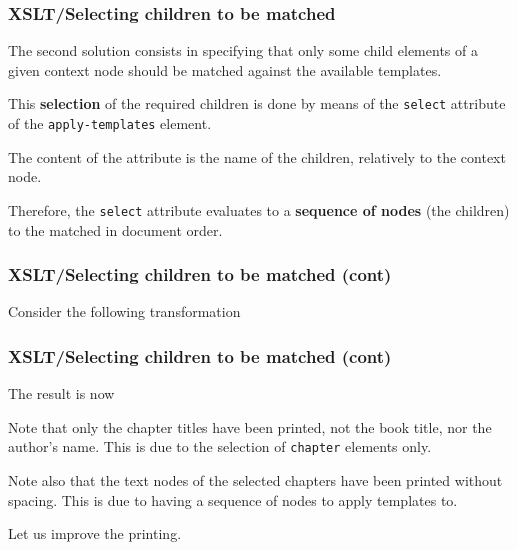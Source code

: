 %
\begin{frame}
\frametitle{XSLT/Selecting children to be matched}

The second solution consists in specifying that only some child
elements of a given context node should be matched against the
available templates.

\bigskip

This \textbf{selection} of the required children is done by means of
the \texttt{select} attribute of the \texttt{apply-templates}
element. 

\bigskip

The content of the attribute is the name of the children,
relatively to the context node.

\bigskip

Therefore, the \texttt{select} attribute evaluates to a
\textbf{sequence of nodes} (the children) to the matched in document
order.

\end{frame}

%
\begin{frame}
\frametitle{XSLT/Selecting children to be matched (cont)}

Consider the following \XSLT transformation

\end{frame}

%
\begin{frame}
\frametitle{XSLT/Selecting children to be matched (cont)}

The result is now

\bigskip

Note that only the chapter titles have been printed, not the book
title, nor the author's name. This is due to the selection of
\texttt{chapter} elements only.

\bigskip

Note also that the text nodes of the selected chapters have been
printed without spacing. This is due to having a sequence of nodes to
apply templates to.

\bigskip

Let us improve the printing.

\end{frame}

